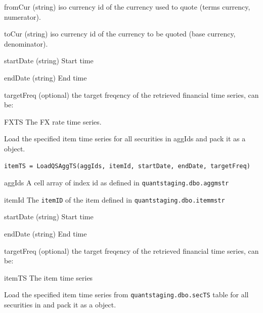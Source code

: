 \inarg
   \begin{argdesc}
   \item[fromCur] (string) iso currency id of the currency used to quote (terms currency, numerator).
   \item[toCur]   (string) iso currency id of the currency to be quoted (base currency, denominator).
   \item[startDate]	(string) Start time
   \item[endDate]	(string) End time
   \item[targetFreq] (optional) the target freqency of the retrieved financial time series, can be:
              
   \end{argdesc}
\outarg
   \begin{argdesc}
   \item[FXTS] The FX rate time series.
   \end{argdesc}

Load the specified item time series for all securities in aggIds
and pack it as a \myfints{} object.

\usage
   \begin{lstlisting}[numbers=none]
   itemTS = LoadQSAggTS(aggIds, itemId, startDate, endDate, targetFreq)
   \end{lstlisting}
\inarg
   \begin{argdesc}
   \item[aggIds] A cell array of index id as defined in \texttt{quantstaging.dbo.aggmstr}
   \item[itemId] The \texttt{itemID} of the item defined in \texttt{quantstaging.dbo.itemmstr}
   \item[startDate] (string) Start time
   \item[endDate] (string) End time
   \item[targetFreq]  (optional) the target freqency of the retrieved financial time series, can be: 
           
   \end{argdesc}
\outarg
   \begin{argdesc}
   \item[itemTS]	 The item time series
   \end{argdesc}
  
Load the specified item time series from \texttt{quantstaging.dbo.secTS} table for 
all securities in 
and pack it as a \myfints{} object.

